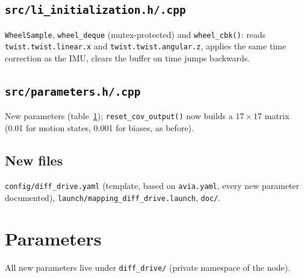 \documentclass[11pt,a4paper]{article}
\newcommand{\f}[1]{\texttt{#1}}
\begin{document}
\subsection{\f{src/li\_initialization.h/.cpp}}
\f{WheelSample}, \f{wheel\_deque} (mutex-protected) and \f{wheel\_cbk()}: reads
\f{twist.twist.linear.x} and \f{twist.twist.angular.z}, applies the same time
correction as the IMU, clears the buffer on time jumps backwards.

\subsection{\f{src/parameters.h/.cpp}}
New parameters (table~\ref{tab:params}); \f{reset\_cov\_output()} now builds a
$17\times17$ matrix (0.01 for motion states, 0.001 for biases, as before).

\subsection{New files}
\f{config/diff\_drive.yaml} (template, based on \f{avia.yaml}, every new
parameter documented), \f{launch/mapping\_diff\_drive.launch}, \f{doc/}.

\section{Parameters}\label{tab:params}
All new parameters live under \f{diff\_drive/} (private namespace of the node).
\end{document}
